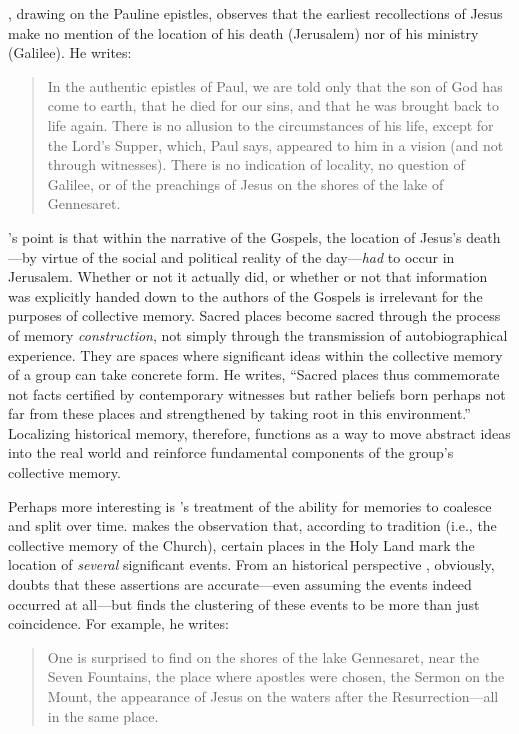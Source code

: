 \halbwachs, drawing on the Pauline epistles, observes that the earliest recollections of Jesus make no mention of the location of his death (Jerusalem) nor of his ministry (Galilee). He writes:  

\begin{quote} In the authentic epistles of Paul, we are told only that the son of God has come to earth, that he died for our sins, and that he was brought back to life again. There is no allusion to the circumstances of his life, except for the Lord's Supper, which, Paul says, appeared to him in a vision (and not through witnesses). There is no indication of locality, no question of Galilee, or of the preachings of Jesus on the shores of the lake of Gennesaret.\autocite[209]{halbwachs1992} \end{quote}  

\halbwachs's point is that within the narrative of the Gospels, the location of Jesus's death---by virtue of the social and political reality of the day---\emph{had} to occur in Jerusalem.\autocite[211]{halbwachs1992} Whether or not it actually did, or whether or not that information was explicitly handed down to the authors of the Gospels is irrelevant for the purposes of collective memory. Sacred places become sacred through the process of memory \emph{construction}, not simply through the transmission of autobiographical experience. They are spaces where significant ideas within the collective memory of a group can take concrete form. He writes, ``Sacred places thus commemorate not facts certified by contemporary witnesses but rather beliefs born perhaps not far from these places and strengthened by taking root in this environment.''\autocite[199]{halbwachs1992} Localizing historical memory, therefore, functions as a way to move abstract ideas into the real world and reinforce fundamental components of the group's collective memory.  

Perhaps more interesting is \halbwachs's treatment of the ability for memories to coalesce and split over time. \halbwachs makes the observation that, according to tradition (i.e., the collective memory of the Church), certain places in the Holy Land mark the location of \emph{several} significant events. From an historical perspective \halbwachs, obviously, doubts that these assertions are accurate---even assuming the events indeed occurred at all---but finds the clustering of these events to be more than just coincidence. For example, he writes:  

\begin{quote} One is surprised to find on the shores of the lake Gennesaret, near the Seven Fountains, the place where apostles were chosen, the Sermon on the Mount, the appearance of Jesus on the waters after the Resurrection---all in the same place.\autocite[220]{halbwachs1992} \end{quote}  


